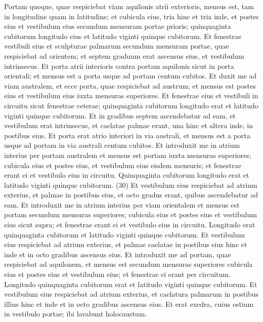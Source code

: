 \begin{biblechapter}
\verse Portam quoque, quae respiciebat viam aquilonis atrii exterioris, mensus est, tam in longitudine quam in latitudine; 
\verse et cubicula eius, tria hinc et tria inde, et postes eius et vestibulum eius secundum mensuram portae prioris; quinquaginta cubitorum longitudo eius et latitudo viginti quinque cubitorum.  
\verse Et fenestrae vestibuli eius et sculpturae palmarum secundum mensuram portae, quae respiciebat ad orientem; et septem graduum erat ascensus eius, et vestibulum intrinsecus. 
\verse Et porta atrii interioris contra portam aquilonis sicut in porta orientali; et mensus est a porta usque ad portam centum cubitos. 
\verse Et duxit me ad viam australem, et ecce porta, quae respiciebat ad austrum; et mensus est postes eius et vestibulum eius iuxta mensuras superiores.  
\verse Et fenestrae eius et vestibuli in circuitu sicut fenestrae ceterae; quinquaginta cubitorum longitudo erat et latitudo viginti quinque cubitorum.  
\verse Et in gradibus septem ascendebatur ad eam, et vestibulum erat intrinsecus, et caelatae palmae erant, una hinc et altera inde, in postibus eius. 
\verse Et porta erat atrio interiori in via australi, et mensus est a porta usque ad portam in via australi centum cubitos. 
\verse Et introduxit me in atrium interius per portam australem et mensus est portam iuxta mensuras superiores; 
\verse cubicula eius et postes eius, et vestibulum eius eisdem mensuris; et fenestrae erant ei et vestibulo eius in circuitu. Quinquaginta cubitorum longitudo erat et latitudo viginti quinque cubitorum. (30) 
\verse Et vestibulum eius respiciebat ad atrium exterius, et palmae in postibus eius, et octo gradus erant, quibus ascendebatur ad eam. 
\verse Et introduxit me in atrium interius per viam orientalem et mensus est portam secundum mensuras superiores; 
\verse cubicula eius et postes eius et vestibulum eius sicut supra; et fenestrae erant ei et vestibulo eius in circuitu. Longitudo erat quinquaginta cubitorum et latitudo viginti quinque cubitorum. 
\verse Et vestibulum eius respiciebat ad atrium exterius, et palmae caelatae in postibus eius hinc et inde et in octo gradibus ascensus eius. 
\verse Et introduxit me ad portam, quae respiciebat ad aquilonem, et mensus est secundum mensuras superiores 
\verse cubicula eius et postes eius et vestibulum eius; et fenestrae ei erant per circuitum. Longitudo quinquaginta cubitorum erat et latitudo viginti quinque cubitorum. 
\verse Et vestibulum eius respiciebat ad atrium exterius, et caelatura palmarum in postibus illius hinc et inde et in octo gradibus ascensus eius. 
\verse Et erat exedra, cuius ostium in vestibulo portae; ibi lavabunt holocaustum. 

\end{biblechapter}
